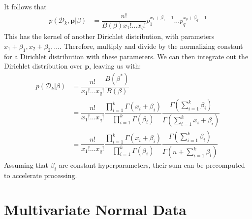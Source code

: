\documentclass{article}
\begin{document}
It follows that
\begin{align*}
  p(\mathcal{D}_k ,\mathbf{p}|\beta) &= \dfrac{n!}{B(\beta)x_1! \dots x_q!}p_1^{x_1+\beta_1-1}\dots p_q^{x_q+\beta_q-1}
\end{align*}
This has the kernel of another Dirichlet distribution, with parameters
$x_1+\beta_1, x_2 + \beta_2, \dots$.  Therefore, multiply and divide
by the normalizing constant for a Dirichlet distribution with these
parameters.  We can then integrate out the Dirichlet distribution over
$\mathbf{p}$, leaving us with:
\begin{align*}
  p(\mathcal{D}_k | \beta) &= \dfrac{n!}{x_1! \dots x_q!}\dfrac{B(\beta^*)}{B(\beta)} \\
    &= \dfrac{n!}{x_1! \dots x_q!}\dfrac{\prod_{i=1}^k\Gamma(x_i+\beta_i)}{\prod_{i=1}^k\Gamma(\beta_i)}\dfrac{\Gamma(\sum_{i=1}^k\beta_i)}{\Gamma(\sum_{i=1}^kx_i+\beta_i)} \\
    &= \dfrac{n!}{x_1! \dots
      x_q!}\dfrac{\prod_{i=1}^k\Gamma(x_i+\beta_i)}{\prod_{i=1}^k\Gamma(\beta_i)}\dfrac{\Gamma(\sum_{i=1}^k\beta_i)}{\Gamma(n + \sum_{i=1}^k\beta_i)}
\end{align*}
Assuming that $\beta_i$ are constant hyperparameters, their sum can be
precomputed to accelerate processing.

\newpage
\section{Multivariate Normal Data}
\end{document}
